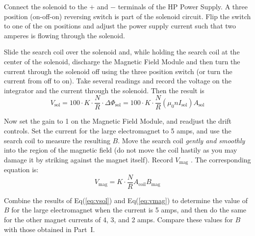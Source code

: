 Connect the solenoid to the $+$ and $-$ terminals of the HP Power Supply. A three position (on-off-on) reversing switch is part of the solenoid circuit. Flip the switch to one of the on positions and adjust the power supply current such that two amperes is flowing through the solenoid.\myskip

Slide the search coil over the solenoid and, while holding the search coil at the center of the solenoid, discharge the Magnetic Field Module and then turn the current through the solenoid off using the three position switch (or turn the current from off to on). Take several readings and record the voltage on the integrator and the current through the solenoid. Then the result is
\begin{equation}
  V_{\mathrm{sol}}=100\cdot K\cdot \frac{N}{R}\cdot \Delta \Phi_{\mathrm{sol}}=100\cdot K\cdot \frac{N}{R}(\mu_{0}nI_{\mathrm{sol}})A_{\mathrm{sol}}
\label{eq:vsol}
\end{equation}

Now set the gain to 1 on the Magnetic Field Module, and readjust the drift controls. Set the current for the large electromagnet to 5 amps, and use the search coil to measure the resulting $B$. Move the search coil \emph{gently and smoothly} into the region of the magnetic field (do not move the coil hastily as you may damage it by striking against the magnet itself). Record $V_{\mathrm{mag}}$ . The corresponding equation is:
\begin{equation}
  V_{\mathrm{mag}}=K\cdot \frac{N}{R}A_{\mathrm{coil}}B_{\mathrm{mag}}
\label{eq:vmag}
\end{equation}

Combine the results of Eq({\ref{eq:vsol}}) and Eq({\ref{eq:vmag}}) to determine the value of $B$ for the large electromagnet when the current is 5 amps, and then do the same for the other magnet currents of 4, 3, and 2 amps. Compare these values for $B$ with those obtained in Part~I.
